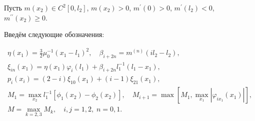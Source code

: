  

 \smallskip




Пусть $m(x_2)\in C^2[0,l_2]$, $m(x_2)>0$, $m^{\prime}(0)>0$, $m^{\prime}(l_2)<0$, $m^{\prime\prime}(x_2)\ge0$. 

Введём следующие обозначения: 

\begin{gather*}

\eta(x_1)=\frac{3}{2}\mu_0^{-1}(x_1-l_1)^2,\quad  \beta_{i+2n}=m^{(n)}(il_2-l_2),

\\

\xi_{in}(x_1)=\eta(x_1)\varphi_i(l_1)+\beta_{i+2n}l_1^{-1}(l_1-x_1),\\

p_i(x_i)=(2-i)\xi_{10}(x_1)+(i-1)\xi_{21}(x_1),\\

M_1=\max\limits_{x_2}l_1^{-1}[\phi_1(x_2)-\phi_2(x_2)],\quad  

M_{i+1}=\max[M_1,\max\limits_{x_1}|\varphi_{ix_1}(x_1)|],\\

M=\max\limits_{k=2, 3}M_k,\quad  i, j=1, 2, \; n=0, 1.

\end{gather*}



\smallskip



\hypertarget{ali:lemma2}{}



